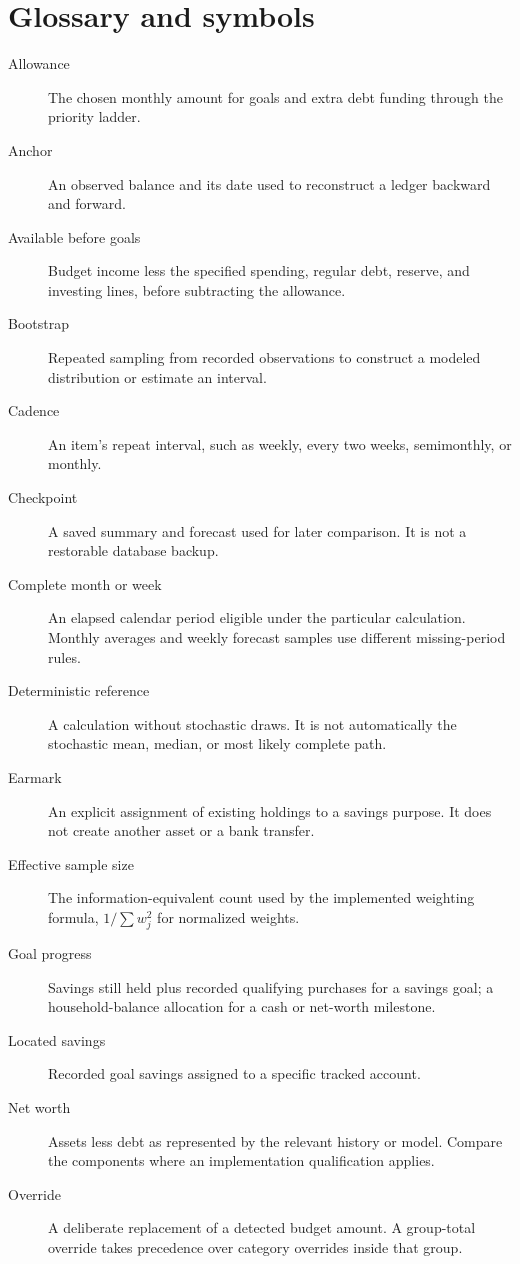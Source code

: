 \chapter{Glossary and symbols}\label{app:glossary}
\begin{description}
\item[Allowance] The chosen monthly amount for goals and extra debt funding through the priority ladder.
\item[Anchor] An observed balance and its date used to reconstruct a ledger backward and forward.
\item[Available before goals] Budget income less the specified spending, regular debt, reserve, and investing lines, before subtracting the allowance.
\item[Bootstrap] Repeated sampling from recorded observations to construct a modeled distribution or estimate an interval.
\item[Cadence] An item's repeat interval, such as weekly, every two weeks, semimonthly, or monthly.
\item[Checkpoint] A saved summary and forecast used for later comparison. It is not a restorable database backup.
\item[Complete month or week] An elapsed calendar period eligible under the particular calculation. Monthly averages and weekly forecast samples use different missing-period rules.
\item[Deterministic reference] A calculation without stochastic draws. It is not automatically the stochastic mean, median, or most likely complete path.
\item[Earmark] An explicit assignment of existing holdings to a savings purpose. It does not create another asset or a bank transfer.
\item[Effective sample size] The information-equivalent count used by the implemented weighting formula, \(1/\sum w_j^2\) for normalized weights.
\item[Goal progress] Savings still held plus recorded qualifying purchases for a savings goal; a household-balance allocation for a cash or net-worth milestone.
\item[Located savings] Recorded goal savings assigned to a specific tracked account.
\item[Net worth] Assets less debt as represented by the relevant history or model. Compare the components where an implementation qualification applies.
\item[Override] A deliberate replacement of a detected budget amount. A group-total override takes precedence over category overrides inside that group.

\end{description}
